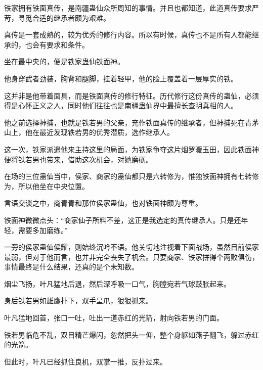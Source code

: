 \begin{this_body}
铁家拥有铁面真传，是南疆蛊仙众所周知的事情。并且也都知道，此道真传要求严苛，寻觅合适的继承者颇为艰难。

真传是一套成熟的，较为优秀的修行内容。所以有时候，真传也不是所有人都能继承的，也会有要求和条件。

坐在最中央的，便是铁家蛊仙铁面神。

他身穿武者劲装，胸背和腿脚，挂着轻甲，他的脸上覆盖着一层厚实的铁。

这并非是他带着面具，而是铁面真传的修行特征。历代修行这份真传的蛊仙，必须得是心怀正义之人，同时他们往往也是南疆蛊仙界中最擅长查明真相的人。

他之前选择神捕，也就是铁若男的父亲，充作铁面真传的继承者，但神捕死在青茅山上，他在最近发现铁若男的优秀潜质，选作继承人。

这一次，铁家派遣他来主持这里的局面，为铁家争夺这片烟罗暖玉田，因此铁面神便将铁若男也带来，借助这次机会，对她磨砺。

在场的三位蛊仙当中，侯家、商家的蛊仙都只是六转修为，惟独铁面神拥有七转修为，所以他坐在中央位置。

言语交谈之中，商青青和那位侯家蛊仙，也对铁面神颇为尊重。

铁面神微微点头：“商家仙子所料不差，这正是我选定的真传继承人。只是还年轻，需要多加磨练。”

一旁的侯家蛊仙侯耀，则始终沉吟不语。他关切地注视着下面战场，虽然目前侯家最弱，但对于他而言，也并非完全丧失了机会。只要商家、铁家拼得个两败俱伤，事情最终是什么结果，还真的是个未知数。

烟尘飞扬，叶凡猛地后退，然后深呼吸一口气，胸膛宛若气球鼓胀起来。

身后铁若男如雄鹰扑下，双手呈爪，狠狠抓来。

叶凡猛地回首，张口一吐，吐出一道赤红的光箭，射向铁若男的门面。

铁若男临危不乱，双目精芒爆闪，忽然把头一仰，整个身躯如燕子翻飞，躲过赤红的光箭。

但此时，叶凡已经抓住良机，双掌一推，反扑过来。

\end{this_body}

